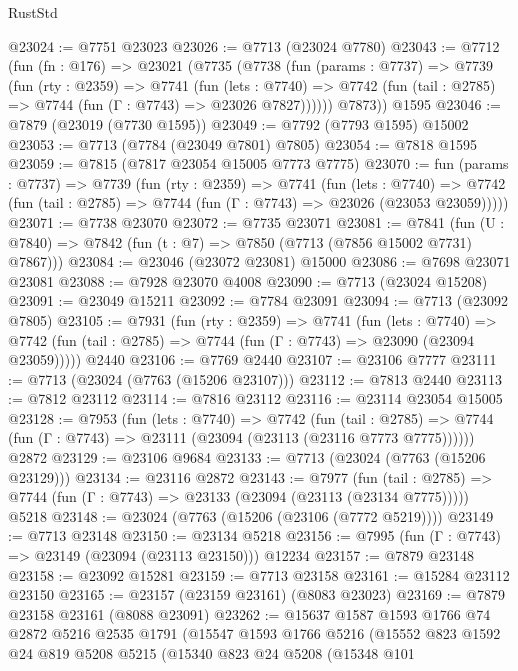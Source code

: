 \begin{lexlean}{RustStd}
\begin{coremodule}
@23024 := @7751 @23023
@23026 := @7713 (@23024 @7780)
@23043 := @7712
    (fun (fn : @176) =>
    @23021
      (@7735
        (@7738
          (fun (params : @7737) =>
          @7739
            (fun (rty : @2359) =>
            @7741
              (fun (lets : @7740) =>
              @7742 (fun (tail : @2785) => @7744 (fun (Γ : @7743) => @23026 @7827))))))
        @7873))
    @1595
@23046 := @7879 (@23019 (@7730 @1595))
@23049 := @7792 (@7793 @1595) @15002
@23053 := @7713 (@7784 (@23049 @7801) @7805)
@23054 := @7818 @1595
@23059 := @7815 (@7817 @23054 @15005 @7773 @7775)
@23070 := fun (params : @7737) =>
  @7739
    (fun (rty : @2359) =>
    @7741
      (fun (lets : @7740) =>
      @7742 (fun (tail : @2785) => @7744 (fun (Γ : @7743) => @23026 (@23053 @23059)))))
@23071 := @7738 @23070
@23072 := @7735 @23071
@23081 := @7841
    (fun (U : @7840) => @7842 (fun (t : @7) => @7850 (@7713 (@7856 @15002 @7731) @7867)))
@23084 := @23046 (@23072 @23081) @15000
@23086 := @7698 @23071 @23081
@23088 := @7928 @23070 @4008
@23090 := @7713 (@23024 @15208)
@23091 := @23049 @15211
@23092 := @7784 @23091
@23094 := @7713 (@23092 @7805)
@23105 := @7931
    (fun (rty : @2359) =>
    @7741
      (fun (lets : @7740) =>
      @7742 (fun (tail : @2785) => @7744 (fun (Γ : @7743) => @23090 (@23094 @23059)))))
    @2440
@23106 := @7769 @2440
@23107 := @23106 @7777
@23111 := @7713 (@23024 (@7763 (@15206 @23107)))
@23112 := @7813 @2440
@23113 := @7812 @23112
@23114 := @7816 @23112
@23116 := @23114 @23054 @15005
@23128 := @7953
    (fun (lets : @7740) =>
    @7742
      (fun (tail : @2785) =>
      @7744 (fun (Γ : @7743) => @23111 (@23094 (@23113 (@23116 @7773 @7775))))))
    @2872
@23129 := @23106 @9684
@23133 := @7713 (@23024 (@7763 (@15206 @23129)))
@23134 := @23116 @2872
@23143 := @7977
    (fun (tail : @2785) => @7744 (fun (Γ : @7743) => @23133 (@23094 (@23113 (@23134 @7775)))))
    @5218
@23148 := @23024 (@7763 (@15206 (@23106 (@7772 @5219))))
@23149 := @7713 @23148
@23150 := @23134 @5218
@23156 := @7995 (fun (Γ : @7743) => @23149 (@23094 (@23113 @23150))) @12234
@23157 := @7879 @23148
@23158 := @23092 @15281
@23159 := @7713 @23158
@23161 := @15284 @23112 @23150
@23165 := @23157 (@23159 @23161) (@8083 @23023)
@23169 := @7879 @23158 @23161 (@8088 @23091)
@23262 := @15637
    @1587
    @1593
    @1766
    @74
    @2872
    @5216
    @2535
    @1791
    (@15547
      @1593
      @1766
      @5216
      (@15552
        @823
        @1592
        @24
        @819
        @5208
        @5215
        (@15340
          @823
          @24
          @5208
          (@15348
            @101

\end{coremodule}
\end{lexlean}
